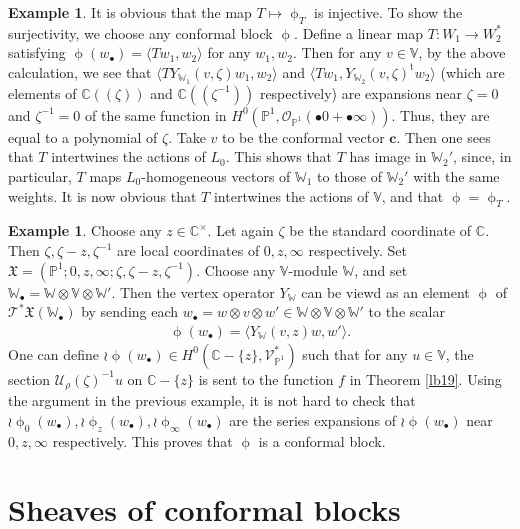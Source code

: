 \documentclass[12pt,b5paper,notitlepage]{report}
\theoremstyle{definition}
\newtheorem{eg}[df]{Example}
\theoremstyle{plain}
\newcommand{\fk}{\mathfrak}
\newcommand{\mc}{\mathcal}
\newcommand{\tr}{\mathrm{t}} %
\newcommand{\bk}[1]{\langle {#1}\rangle}
\newcommand{\scr}{\mathscr}
\newcommand{\blt}{\bullet}
\newcommand{\Vbb}{\mathbb V}
\newcommand{\Wbb}{\mathbb W}
\newcommand{\Cbb}{\mathbb C}
\newcommand{\Pbb}{\mathbb P}
\newcommand{\cbf}{\mathbf c}
\numberwithin{equation}{section}
\begin{document}
\begin{eg}
It is obvious that the map $T\mapsto\upphi_T$ is injective. To show the surjectivity, we choose any conformal block $\upphi$. Define a linear map $T:W_1\rightarrow W_2^*$ satisfying  $\upphi(w_\blt)=\bk{Tw_1,w_2}$ for any $w_1,w_2$. Then for any $v\in \Vbb$, by the above calculation, we see that   $\bk{TY_{\Wbb_1}(v,\zeta)w_1,w_2}$ and $\bk{Tw_1,Y_{\Wbb_2}(v,\zeta)^\tr w_2}$ (which are elements of $\Cbb((\zeta))$ and $\Cbb((\zeta^{-1}))$ respectively) are expansions near $\zeta=0$ and $\zeta^{-1}=0$ of the same function in $H^0(\Pbb^1,\scr O_{\Pbb^1}(\blt 0+\blt\infty))$. Thus, they are equal to a polynomial of $\zeta$. Take $v$ to be the conformal vector $\cbf$. Then one sees that $T$ intertwines the actions of $L_0$. This shows that $T$ has image in $\Wbb_2'$, since, in particular, $T$ maps $L_0$-homogeneous vectors of $\Wbb_1$ to those of $\Wbb_2'$ with the same weights. It is now obvious that $T$ intertwines the actions of $\Vbb$, and that $\upphi=\upphi_T$.
\end{eg}


\begin{eg}\label{lb44}
Choose any $z\in\Cbb^\times$.  Let again $\zeta$ be the standard coordinate of $\Cbb$. Then $\zeta,\zeta-z,\zeta^{-1}$ are local coordinates of $0,z,\infty$ respectively. Set  $\fk X=(\Pbb^1;0,z,\infty;\zeta,\zeta-z,\zeta^{-1})$. Choose any $\Vbb$-module $\Wbb$, and set  $\Wbb_\blt=\Wbb\otimes\Vbb\otimes\Wbb'$. Then the vertex operator $Y_\Wbb$ can be viewd as an element $\upphi$ of $\scr T^*{\fk X}(\Wbb_\blt)$ by sending each $w_\blt=w\otimes v\otimes w'\in\Wbb\otimes\Vbb\otimes\Wbb'$ to the scalar
\begin{align*}
\upphi(w_\blt)=\bk{Y_\Wbb(v,z)w,w'}.
\end{align*}
One can define $\wr\upphi(w_\blt)\in H^0(\Cbb-\{z\},\scr V_{\Pbb^1}^*)$ such that for any $u\in\Vbb$, the section $\mc U_\rho(\zeta)^{-1}u$ on $\Cbb-\{z\}$ is sent to the function $f$ in Theorem \ref{lb19}. Using the argument in the previous example, it is not hard to check that $\wr\upphi_0(w_\blt),\wr\upphi_z(w_\blt),\wr\upphi_\infty(w_\blt)$ are the series expansions of $\wr\upphi(w_\blt)$ near $0,z,\infty$ respectively. This proves that $\upphi$ is a conformal block.
\end{eg}






\section{Sheaves of conformal blocks}
\end{document}
